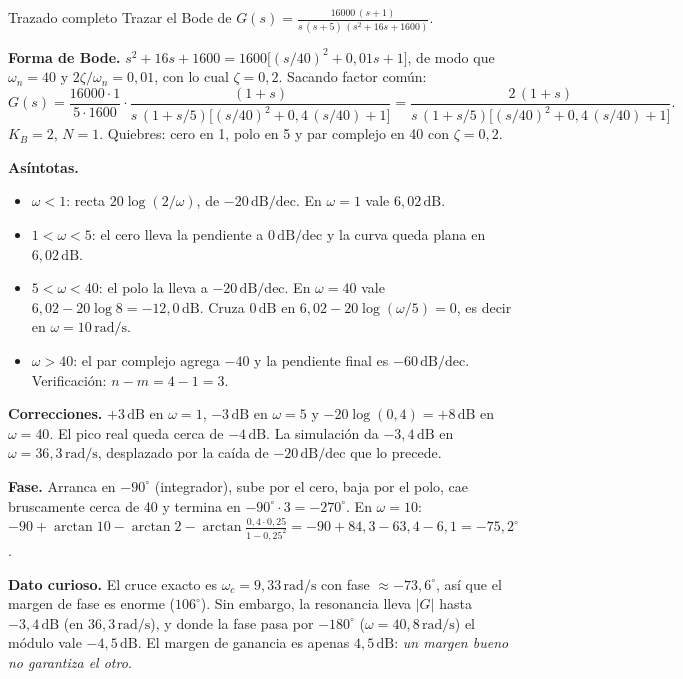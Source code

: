 \documentclass[11pt,a4paper]{article}
\newcounter{ejemplo}
\newenvironment{ejemplo}[1]{\refstepcounter{ejemplo}\begin{ejemplobox}{#1}}{\end{ejemplobox}}
\newcommand{\dB}{\,\mathrm{dB}}
\newcommand{\dBdec}{\,\mathrm{dB/dec}}
\newcommand{\rads}{\,\mathrm{rad/s}}
\newcommand{\wc}{\omega_c}
\begin{document}
\begin{ejemplo}{Trazado completo}
\label{ej:bode}
Trazar el Bode de $\displaystyle G(s)=\frac{16000\,(s+1)}{s\,(s+5)\,(s^2+16s+1600)}$.

\textbf{Forma de Bode.} $s^2+16s+1600=1600\big[(s/40)^2+0{,}01s+1\big]$, de modo que $\omega_n=40$ y
$2\zeta/\omega_n=0{,}01$, con lo cual $\zeta=0{,}2$. Sacando factor común:
\[
G(s)=\frac{16000\cdot1}{5\cdot1600}\cdot\frac{(1+s)}{s\,(1+s/5)\big[(s/40)^2+0{,}4\,(s/40)+1\big]}
=\frac{2\,(1+s)}{s\,(1+s/5)\big[(s/40)^2+0{,}4\,(s/40)+1\big]}.
\]
$K_B=2$, $N=1$. Quiebres: cero en 1, polo en 5 y par complejo en 40 con $\zeta=0{,}2$.

\textbf{Asíntotas.}
\begin{itemize}
\item $\omega<1$: recta $20\log(2/\omega)$, de $-20\dBdec$. En $\omega=1$ vale $6{,}02\dB$.
\item $1<\omega<5$: el cero lleva la pendiente a $0\dBdec$ y la curva queda plana en $6{,}02\dB$.
\item $5<\omega<40$: el polo la lleva a $-20\dBdec$. En $\omega=40$ vale $6{,}02-20\log 8=-12{,}0\dB$.
      Cruza $0\dB$ en $6{,}02-20\log(\omega/5)=0$, es decir en $\omega=10\rads$.
\item $\omega>40$: el par complejo agrega $-40$ y la pendiente final es $-60\dBdec$. Verificación: $n-m=4-1=3$.
\end{itemize}
\textbf{Correcciones.} $+3\dB$ en $\omega=1$, $-3\dB$ en $\omega=5$ y $-20\log(0{,}4)=+8\dB$ en $\omega=40$. El pico real
queda cerca de $-4\dB$. La simulación da $-3{,}4\dB$ en $\omega=36{,}3\rads$, desplazado por la caída de $-20\dBdec$ que lo precede.

\textbf{Fase.} Arranca en $-90^\circ$ (integrador), sube por el cero, baja por el polo, cae bruscamente cerca de 40
y termina en $-90^\circ\cdot3=-270^\circ$. En $\omega=10$:
$-90+\arctan10-\arctan2-\arctan\frac{0{,}4\cdot0{,}25}{1-0{,}25^2}=-90+84{,}3-63{,}4-6{,}1=-75{,}2^\circ$.

\textbf{Dato curioso.} El cruce exacto es $\wc=9{,}33\rads$ con fase $\approx-73{,}6^\circ$, así que el margen de fase es enorme ($106^\circ$).
Sin embargo, la resonancia lleva $|G|$ hasta $-3{,}4\dB$ (en $36{,}3\rads$), y donde la fase pasa por $-180^\circ$
($\omega=40{,}8\rads$) el módulo vale $-4{,}5\dB$. El margen de ganancia es apenas $4{,}5\dB$: \emph{un margen bueno no garantiza el otro}.
\end{ejemplo}
\end{document}
